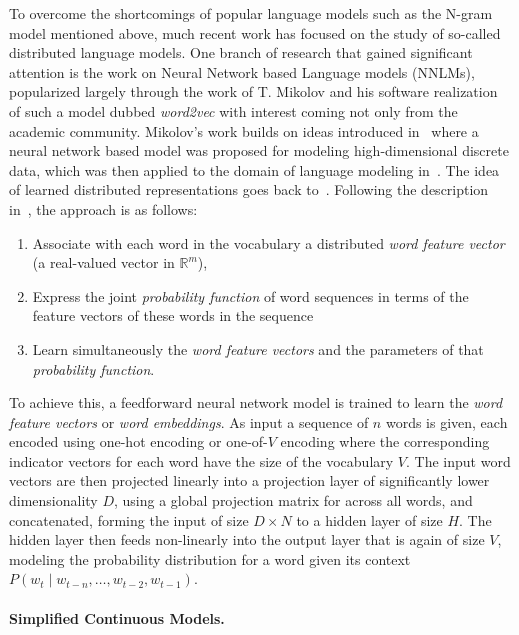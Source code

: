 To overcome the shortcomings of popular language models such as the N-gram model mentioned above, much recent work has focused on the study of so-called distributed language models. One branch of research that gained significant attention is the work on Neural Network based Language models (NNLMs), popularized largely through the work of T. Mikolov and his software realization of such a model dubbed \emph{word2vec} with interest coming not only from the academic community. Mikolov's work builds on ideas introduced in~\cite{Bengio:2000aa} where a neural network based model was proposed for modeling high-dimensional discrete data, which was then applied to the domain of language modeling in~\cite{bengio2003neural}. The idea of learned distributed representations goes back to~\cite{Hinton:1986aa}. Following the description in~\cite{Bengio:2000aa}, the approach is as follows:

\begin{enumerate}
  \item Associate with each word in the vocabulary a distributed \emph{word feature vector} (a real-valued vector in $\mathbb{R}^m$),
  \item Express the joint \emph{probability function} of word sequences in terms of the feature vectors of these words in the sequence
  \item Learn simultaneously the \emph{word feature vectors} and the parameters of that \emph{probability function}.
\end{enumerate}

To achieve this, a feedforward neural network model is trained to learn the \emph{word feature vectors} or \emph{word embeddings}. As input a sequence of $n$ words is given, each encoded using one-hot encoding or one-of-$V$ encoding where the corresponding indicator vectors for each word have the size of the vocabulary $V$. The input word vectors are then projected linearly into a projection layer of significantly lower dimensionality $D$, using a global projection matrix for across all words, and concatenated, forming the input of size $D \times N$ to a hidden layer of size $H$. The hidden layer then feeds non-linearly into the output layer that is again of size $V$, modeling the probability distribution for a word given its context $P(w_t \mid w_{t - n}, \ldots, w_{t - 2}, w_{t - 1})$.

\paragraph{Simplified Continuous Models.}

